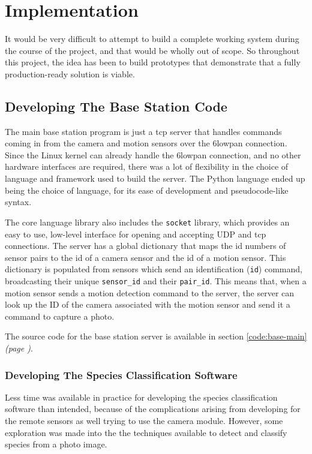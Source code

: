 \chapter{Implementation}

It would be very difficult to attempt to build a complete working system
during the course of the project, and that would be wholly out of scope. So
throughout this project, the idea has been to build prototypes that
demonstrate that a fully production-ready solution is viable.


\section{Developing The Base Station Code}
The main base station program is just a \acrshort{tcp} server that handles
commands coming in from the camera and motion sensors over the \gls{6lowpan}
connection. Since the Linux kernel can already handle the \gls{6lowpan}
connection, and no other hardware interfaces are required, there was a lot of
flexibility in the choice of language and framework used to build the server.
The Python language ended up being the choice of language, for its ease of
development and pseudocode-like syntax.

The core language library also includes the \texttt{socket} library, which
provides an easy to use, low-level interface for opening and accepting UDP
and \acrshort{tcp} connections. The server has a global dictionary that maps
the id numbers of sensor pairs to the id of a camera sensor and the id of a
motion sensor. This dictionary is populated from sensors which send an
identification (\texttt{id}) command, broadcasting their unique
\texttt{sensor\_id} and their \texttt{pair\_id}. This means that, when a
motion sensor sends a motion detection command to the server, the server can
look up the ID of the camera associated with the motion sensor and send it a
command to capture a photo.

The source code for the base station server is available in section
\ref{code:base-main} \textit{(page \pageref{code:base-main})}.

\subsection{Developing The Species Classification Software}
Less time was available in practice for developing the species classification
software than intended, because of the complications arising from developing
for the remote sensors as well trying to use the camera module. However, some
exploration was made into the the techniques available to detect and classify
species from a photo image.

